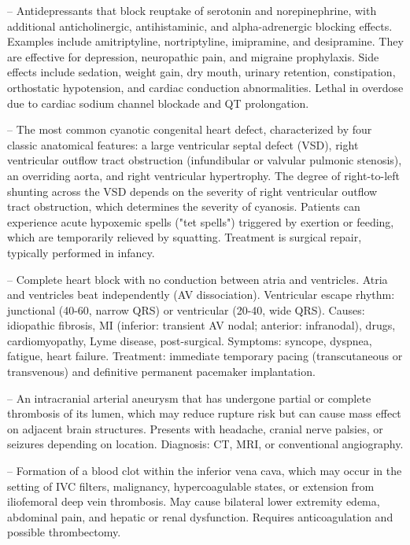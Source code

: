 -- Antidepressants that block reuptake of serotonin and norepinephrine, with additional anticholinergic, antihistaminic, and alpha-adrenergic blocking effects. Examples include amitriptyline, nortriptyline, imipramine, and desipramine. They are effective for depression, neuropathic pain, and migraine prophylaxis. Side effects include sedation, weight gain, dry mouth, urinary retention, constipation, orthostatic hypotension, and cardiac conduction abnormalities. Lethal in overdose due to cardiac sodium channel blockade and QT prolongation.

-- The most common cyanotic congenital heart defect, characterized by four classic anatomical features: a large ventricular septal defect (VSD), right ventricular outflow tract obstruction (infundibular or valvular pulmonic stenosis), an overriding aorta, and right ventricular hypertrophy. The degree of right-to-left shunting across the VSD depends on the severity of right ventricular outflow tract obstruction, which determines the severity of cyanosis. Patients can experience acute hypoxemic spells ("tet spells") triggered by exertion or feeding, which are temporarily relieved by squatting. Treatment is surgical repair, typically performed in infancy.

-- Complete heart block with no conduction between atria and ventricles. Atria and ventricles beat independently (AV dissociation). Ventricular escape rhythm: junctional (40-60, narrow QRS) or ventricular (20-40, wide QRS). Causes: idiopathic fibrosis, MI (inferior: transient AV nodal; anterior: infranodal), drugs, cardiomyopathy, Lyme disease, post-surgical. Symptoms: syncope, dyspnea, fatigue, heart failure. Treatment: immediate temporary pacing (transcutaneous or transvenous) and definitive permanent pacemaker implantation.

-- An intracranial arterial aneurysm that has undergone partial or complete thrombosis of its lumen, which may reduce rupture risk but can cause mass effect on adjacent brain structures. Presents with headache, cranial nerve palsies, or seizures depending on location. Diagnosis: CT, MRI, or conventional angiography.

-- Formation of a blood clot within the inferior vena cava, which may occur in the setting of IVC filters, malignancy, hypercoagulable states, or extension from iliofemoral deep vein thrombosis. May cause bilateral lower extremity edema, abdominal pain, and hepatic or renal dysfunction. Requires anticoagulation and possible thrombectomy.


